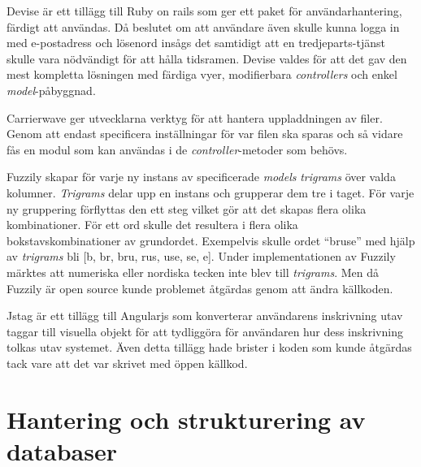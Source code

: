 Devise är ett tillägg till Ruby on rails som ger ett paket för
användarhantering, färdigt att användas. Då beslutet om att användare även
skulle kunna logga in med e-postadress och lösenord insågs det samtidigt att en
tredjeparts-tjänst skulle vara nödvändigt för att hålla tidsramen. Devise valdes
för att det gav den mest kompletta lösningen med färdiga vyer, modifierbara
\emph{controllers} och enkel \emph{model}-påbyggnad.

Carrierwave ger utvecklarna verktyg för att hantera uppladdningen av filer.
Genom att endast specificera inställningar för var filen ska sparas och så
vidare fås en modul som kan användas i de \emph{controller}-metoder som behövs.

Fuzzily skapar för varje ny instans av specificerade \emph{models}
\emph{trigrams} över valda kolumner. \emph{Trigrams} delar upp en instans och
grupperar dem tre i taget. För varje ny gruppering förflyttas den ett steg
vilket gör att det skapas flera olika kombinationer. För ett ord skulle det
resultera i flera olika bokstavskombinationer av grundordet. Exempelvis skulle
ordet “bruse” med hjälp av \emph{trigrams} bli [b, br, bru, rus, use, se, e].
Under implementationen av Fuzzily märktes att numeriska eller nordiska tecken
inte blev till \emph{trigrams}. Men då Fuzzily är open source kunde problemet
åtgärdas genom att ändra källkoden.

Jstag är ett tillägg till Angularjs som konverterar användarens inskrivning utav
taggar till visuella objekt för att tydliggöra för användaren hur dess
inskrivning tolkas utav systemet. Även detta tillägg hade brister i koden som
kunde åtgärdas tack vare att det var skrivet med öppen källkod.

\section{Hantering och strukturering av databaser}

